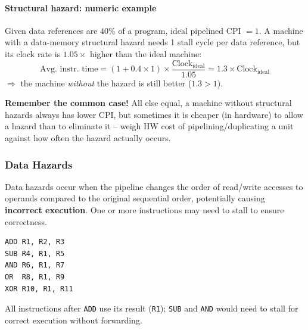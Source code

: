 \begin{center}
\begin{minipage}{\linewidth}
\begin{tikzpicture}[font=\scriptsize]
\end{tikzpicture}
\end{minipage}
\end{center}

\paragraph{Structural hazard: numeric example}

\begin{eg}
Given data references are $40\%$ of a program, ideal pipelined CPI $=1$. A
machine with a data-memory structural hazard needs 1 stall cycle per data
reference, but its clock rate is $1.05\times$ higher than the ideal
machine:
\[
  \text{Avg.\ instr.\ time} = (1+0.4\times1)\times\frac{\text{Clock}_{\text{ideal}}}{1.05} = 1.3\times \text{Clock}_{\text{ideal}}
\]
$\Rightarrow$ the machine \emph{without} the hazard is still better ($1.3 >
1$).
\end{eg}

\begin{remark}
\textbf{Remember the common case!} All else equal, a machine without
structural hazards always has lower CPI, but sometimes it is cheaper (in
hardware) to allow a hazard than to eliminate it -- weigh HW cost of
pipelining/duplicating a unit against how often the hazard actually occurs.
\end{remark}

\subsubsection{Data Hazards}
\label{sec:data-hazards}

\begin{definition}
Data hazards occur when the pipeline changes the order of read/write
accesses to operands compared to the original sequential order, potentially
causing \textbf{incorrect execution}. One or more instructions may need to
stall to ensure correctness.
\end{definition}

\begin{eg}[RAW on R1]
\leavevmode
\begin{lstlisting}
ADD R1, R2, R3
SUB R4, R1, R5
AND R6, R1, R7
OR  R8, R1, R9
XOR R10, R1, R11
\end{lstlisting}
All instructions after \texttt{ADD} use its result (\texttt{R1}); \texttt{SUB}
and \texttt{AND} would need to stall for correct execution without
forwarding.
\end{eg}

